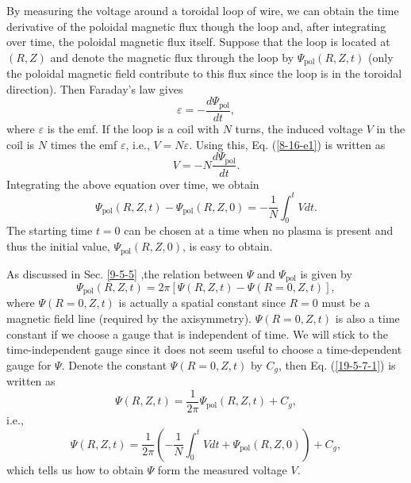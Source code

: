 \documentclass{article}
\newcommand{\tmop}[1]{\ensuremath{\operatorname{#1}}}
\begin{document}
By measuring the voltage around a toroidal loop of wire, we can obtain the
time derivative of the poloidal magnetic flux though the loop and, after
integrating over time, the poloidal magnetic flux itself. Suppose that the
loop is located at $(R, Z)$ and denote the magnetic flux through the loop by
$\Psi_{\tmop{pol}} (R, Z, t)$ (only the poloidal magnetic field contribute to
this flux since the loop is in the toroidal direction). Then Faraday's law
gives
\begin{equation}
  \label{8-16-e1} \varepsilon = - \frac{d \Psi_{\tmop{pol}}}{d t},
\end{equation}
where $\varepsilon$ is the emf. If the loop is a coil with $N$ turns, the
induced voltage $V$ in the coil is $N$ times the emf $\varepsilon$, i.e., $V =
N \varepsilon$. Using this, Eq. (\ref{8-16-e1}) is written as
\begin{equation}
  \label{8-16-e2} V = - N \frac{d \Psi_{\tmop{pol}}}{d t} .
\end{equation}
Integrating the above equation over time, we obtain
\begin{equation}
  \Psi_{\tmop{pol}} (R, Z, t) - \Psi_{\tmop{pol}} (R, Z, 0) = - \frac{1}{N}
  \int_0^t V dt.
\end{equation}
The starting time $t = 0$ can be chosen at a time when no plasma is present
and thus the initial value, $\Psi_{\tmop{pol}} (R, Z, 0)$, is easy to obtain.

As discussed in Sec. \ref{9-5-5} ,the relation between $\Psi$ and
$\Psi_{\tmop{pol}}$ is given by
\begin{equation}
  \label{19-5-7-1} \Psi_{\tmop{pol}} (R, Z, t) = 2 \pi [\Psi (R, Z, t) - \Psi
  (R = 0, Z, t)],
\end{equation}
where $\Psi (R = 0, Z, t)$ is actually a spatial constant since $R = 0$ must
be a magnetic field line (required by the axisymmetry). $\Psi (R = 0, Z, t)$
is also a time constant if we choose a gauge that is independent of time. We
will stick to the time-independent gauge since it does not seem useful to
choose a time-dependent gauge for $\Psi$. Denote the constant $\Psi (R = 0, Z,
t)$ by $C_g$, then Eq. (\ref{19-5-7-1}) is written as
\begin{equation}
  \Psi (R, Z, t) = \frac{1}{2 \pi} \Psi_{\tmop{pol}} (R, Z, t) + C_g,
\end{equation}
i.e.,
\begin{equation}
  \Psi (R, Z, t) = \frac{1}{2 \pi} \left( - \frac{1}{N} \int_0^t V dt +
  \Psi_{\tmop{pol}} (R, Z, 0) \right) + C_g,
\end{equation}
which tells us how to obtain $\Psi$ form the measured voltage $V$.
\end{document}
